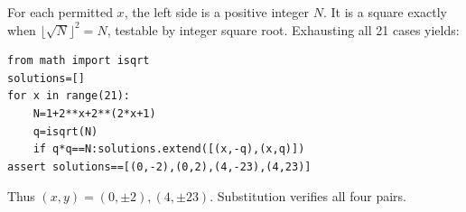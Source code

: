 For each permitted $ x $, the left side is a positive integer $ N $. It is a square exactly when $\lfloor\sqrt N\rfloor^2=N $, testable by integer square root. Exhausting all 21 cases yields:
\begin{verbatim}
from math import isqrt
solutions=[]
for x in range(21):
    N=1+2**x+2**(2*x+1)
    q=isqrt(N)
    if q*q==N:solutions.extend([(x,-q),(x,q)])
assert solutions==[(0,-2),(0,2),(4,-23),(4,23)]
\end{verbatim}
Thus $\boxed{(x,y)=(0,\pm2),(4,\pm23)}$. Substitution verifies all four pairs.
